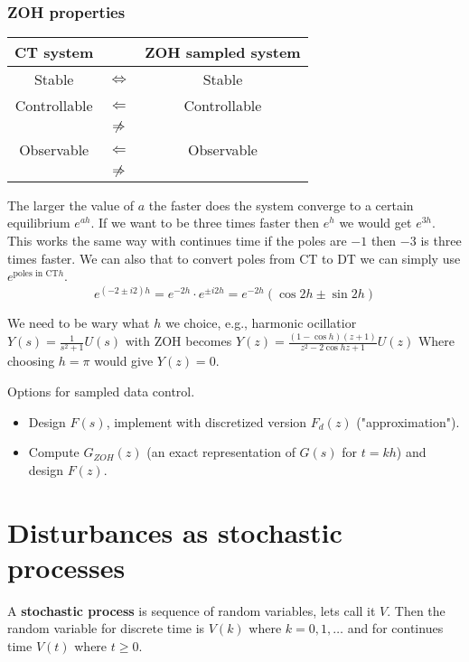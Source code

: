 \begin{multicols}{2}
\subsubsection{ZOH properties}
\begin{center}
    \begin{tabular}{ |c c c| }
        \hline
     CT system & & ZOH sampled system \\ 
        \hline
     Stable & $\Leftrightarrow$ & Stable \\ 
        \hline
     Controllable & $\Leftarrow$ & Controllable \\ 
     & $\centernot\Rightarrow$ &  \\ 
        \hline
     Observable & $\Leftarrow$ & Observable \\ 
     & $\centernot\Rightarrow$ &  \\ 
        \hline
    \end{tabular}
\end{center}

The larger the value of $a$ the faster does the system converge to a certain equilibrium
$e^{ah}$. If we want to be three times faster then $e^h$ we would get $e^{3h}$.
This works the same way with continues time if the poles are $-1$ then $-3$ is three times faster.
We can also that to convert poles from CT to DT we can simply use $e^{\text{poles in CT}h}$.
\begin{equation*}
    e^{(-2\pm i2)h} = e^{-2h} \cdot e^{\pm i2h} =  e^{-2h} (\cos{2h}\pm\sin{2h})
\end{equation*}

We need to be wary what $h$ we choice, e.g., harmonic ocillatior
$Y(s) = \frac{1}{s^2+1}U(s)$ with ZOH becomes $Y(z)=\frac{(1-\cos{h})(z+1)}{z^2-2\cos{h}z+1}U(z)$
Where choosing $h=\pi$ would give $Y(z)=0$.

Options for sampled data control.
\begin{itemize}
    \item Design $F(s)$, implement with discretized version $F_d(z)$ ("approximation").
    \item Compute $G_{ZOH}(z)$ (an exact representation of $G(s)$ for $t=kh$) and design $F(z)$.
\end{itemize}


\section{Disturbances as stochastic processes}
A \textbf{stochastic process} is sequence of random 
variables, lets call it $V$. Then the random variable 
for discrete time is $V(k)$ where $k=0,1,\ldots$
and for continues time $V(t)$ where $t\geq0$.


\end{multicols}
